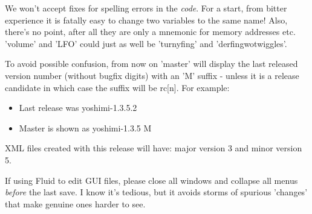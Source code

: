    We won't accept fixes for spelling errors in the \textsl{code}.
   For a start, from bitter experience it is fatally easy to change two
   variables to the same name! Also, there's no point, after all they are only
   a mnemonic for memory addresses etc. 'volume' and 'LFO' could just as well
   be 'turnyfing' and 'derfingwotwiggles'.

   To avoid possible confusion, from now on 'master' will display the last
   released version number (without bugfix digits) with an 'M' suffix - unless
   it is a release candidate in which case the suffix will be rc[n].
   For example:

   \begin{itemize}
      \item Last release was yoshimi-1.3.5.2
      \item Master is shown as yoshimi-1.3.5 M
   \end{itemize}

   XML files created with this release will have:
   major version 3 and minor version 5.

   If using Fluid to edit GUI files, please close all windows and collapse all
   menus \textsl{before} the last save.  I know it's tedious, but it avoids
   storms of spurious 'changes' that make genuine ones harder to see.

